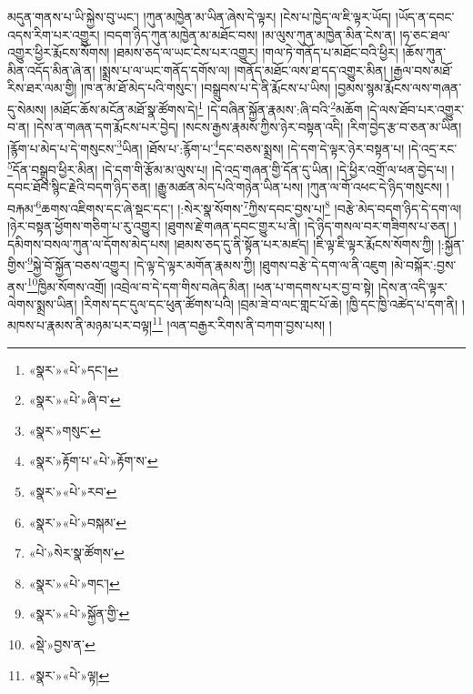 མདུན་གནས་པ་ཡི་སྐྱེས་བུ་ཡང་། །ཀུན་མཁྱེན་མ་ཡིན་ཞེས་དེ་ལྟར། །ངེས་པ་ཁྱེད་ལ་ཇི་ལྟར་ཡོད། །ཡོད་ན་དབང་འདས་རིག་པར་འགྱུར། །བདག་ཉིད་ཀུན་མཁྱེན་མ་མཐོང་བས། །མ་ལུས་ཀུན་མཁྱེན་མིན་ངེས་ན། །ཧ་ཅང་ཐལ་འགྱུར་ཕྱིར་རྨོངས་སོགས། །ཐམས་ཅད་ལ་ཡང་ངེས་པར་འགྱུར། །གལ་ཏེ་གནོད་པ་མཐོང་བའི་ཕྱིར། །ཆོས་ཀུན་མིན་འདོད་མིན་ཞེ་ན། །སྨྲས་པ་ལ་ཡང་གནོད་དགོས་ལ། །གནོད་མཐོང་ལས་ཐ་དད་འགྱུར་མིན། །རྒྱལ་བས་མཐོ་རིས་ཐར་ལམ་གྱི། །ཁ་ན་མ་ཐོ་མེད་པའི་གསུང་། །བསྒྲུབས་པ་དེ་ནི་རྨོངས་པ་ཡིས། །བྱམས་སྙམ་རྨོངས་ལས་གཞན་དུ་སེམས། །མཐོང་ཆོས་མངོན་མཐོ་སྣ་ཚོགས་དེ།\footnote{«སྣར་»«པེ་»དང་།} །དེ་བཞིན་སྐྱོན་རྣམས་:ཞི་བའི་\footnote{«སྣར་»«པེ་»ཞི་བ་}མཆོག །དེ་ལས་ཐོབ་པར་འགྱུར་བ་ན། །དེས་ན་གཞན་དག་རྨོངས་པར་བྱེད། །སངས་རྒྱས་རྣམས་ཀྱིས་ཉེར་བསྟན་འདི། །རིག་བྱེད་རྩ་བ་ཅན་མ་ཡིན། །རྙོག་པ་མེད་པ་དེ་གསུངས་\footnote{«སྣར་»གསུང་}ཡིན། །ཐོས་པ་:རྙོག་པ་\footnote{«སྣར་»རྟོག་པ་«པེ་»རྟོག་ས་}དང་བཅས་སྨྲས། །དེ་དག་དེ་ལྟར་ཉེར་བསྟན་པ། །དེ་འདྲ་རང་\footnote{«སྣར་»«པེ་»རབ་}དོན་བསྒྲུབ་ཕྱིར་མིན། །དེ་དག་གི་རྩོམ་མ་ལུས་པ། །དེ་འདྲ་གཞན་གྱི་དོན་དུ་ཡིན། །དེ་ཕྱིར་འགྲོ་ལ་ཕན་བྱེད་པ། །དབང་ཐོབ་སྙིང་རྗེའི་བདག་ཉིད་ཅན། །རྒྱུ་མཚན་མེད་པའི་གཉེན་ཡིན་པས། །ཀུན་ལ་གོ་འཕང་དེ་ཉིད་གསུངས། །བརྐམ་\footnote{«སྣར་»«པེ་»བསྐམ་}ཆགས་འཇིགས་དང་ཞེ་སྡང་དང་། །:སེར་སྣ་སོགས་\footnote{«པེ་»སེར་སྣ་ཚོགས་}ཀྱིས་དབང་བྱས་པ།\footnote{«སྣར་»«པེ་»གང་།} །བརྩེ་མེད་བདག་ཉིད་དེ་དག་ལ། །ཉེར་བསྟན་ཕྱོགས་གཅིག་པ་རུ་འགྱུར། །ཐུགས་རྗེ་གཞན་དབང་གྱུར་པ་ནི། །དེ་ཉིད་གསལ་བར་གཟིགས་པ་ཅན། །དམིགས་བསལ་ཀུན་ལ་དོགས་མེད་པས། །ཐམས་ཅད་དུ་ནི་སྟོན་པར་མཛད། །ཇི་ལྟ་ཇི་ལྟར་རྨོངས་སོགས་ཀྱི། །:སྐྱོན་གྱིས་\footnote{«སྣར་»«པེ་»སྐྱོན་གྱི་}སྐྱེ་བོ་སྐྱོན་བཅས་འགྱུར། །དེ་ལྟ་དེ་ལྟར་མགོན་རྣམས་ཀྱི། །ཐུགས་བརྩེ་དེ་དག་ལ་ནི་འཇུག །མེ་བསྐོར་:བྱས་ནས་\footnote{«སྡེ་»བྱས་ན་}ཁྱིམ་སོགས་འགྲོ། །འབྲེལ་བ་དེ་དག་གིས་བཞེད་མིན། །ཕན་པ་གདགས་པར་བྱ་བ་སྟེ། །དེས་ན་འདི་ལྟར་ལེགས་སྨྲས་ཡིན། །རིགས་དང་དུལ་དང་ཕུན་ཚོགས་པའི། །བྲམ་ཟེ་བ་ལང་གླང་པོ་ཆེ། །ཁྱི་དང་ཁྱི་འཚེད་པ་དག་ནི། །མཁས་པ་རྣམས་ནི་མཉམ་པར་བལྟ།\footnote{«སྣར་»«པེ་»ལྟ།} །ལན་བརྒྱར་རིགས་ནི་བཀག་བྱས་པས། །
